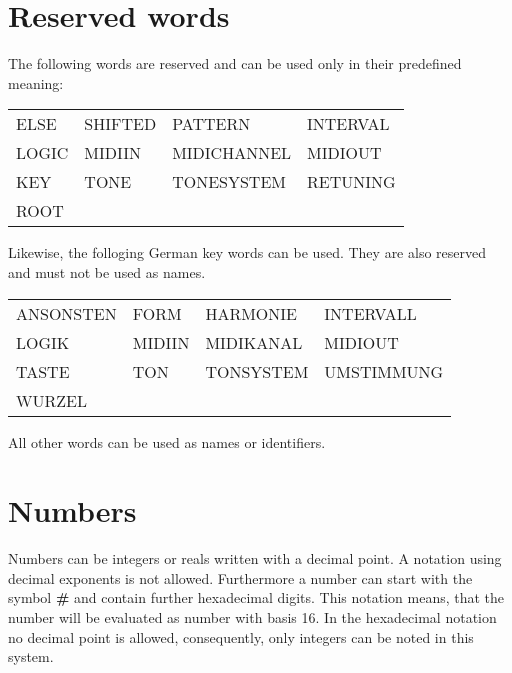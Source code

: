 \section{Reserved words}\label{sec:reservierte-worte}
\label{zweivier}

The following words are reserved
and can be used only in their predefined meaning:

\begin{center}
\begin{tabular}{|llll|}
	      \hline
   ELSE & SHIFTED   & PATTERN & INTERVAL \\
   LOGIC  & MIDIIN   & MIDICHANNEL & MIDIOUT    \\
   KEY     & TONE    & TONESYSTEM &  RETUNING \\
   ROOT    &        &           &              \\
 \hline
\end{tabular}
\end{center}

Likewise, the folloging German key words can be used. They are also
reserved and must not be used as names.

\begin{center}
\begin{tabular}{|llll|}
	      \hline
   ANSONSTEN & FORM   & HARMONIE & INTERVALL \\
   LOGIK  & MIDIIN   & MIDIKANAL & MIDIOUT    \\
   TASTE     & TON    & TONSYSTEM &   UMSTIMMUNG \\
   WURZEL    &        &           &              \\
 \hline
\end{tabular}
\end{center}

All other words can be used as names or identifiers.

\section{Numbers}\label{sec:zahlen}
\label{zweifuenf}

Numbers can be integers or reals written with a decimal point. A
notation using decimal exponents is not allowed.
Furthermore a number can start with the symbol \textbf{\#}
and contain further hexadecimal digits. This notation
means, that the number will be evaluated as number with basis 16. In
the hexadecimal notation no decimal point is allowed, consequently,
only integers can be noted in this system.

